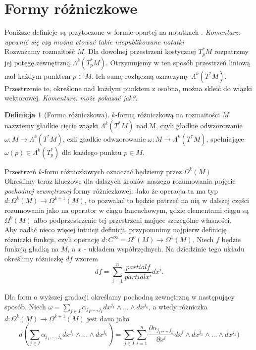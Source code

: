 \documentclass[licencjacka]{pracamgr}
\theoremstyle{definition}
\newtheorem{definition}{Definicja}[section]
\theoremstyle{definition}
\theoremstyle{plain}
\theoremstyle{plain}
\begin{document}
\section{Formy różniczkowe}
Poniższe definicje są przytoczone w formie opartej na notatkach
\cite{duszenko}. 
\emph{Komentarz: upewnić się czy można ctować takie niepublikowane notatki}
\\

Rozważamy rozmaitość $M$. Dla dowolnej przestrzeni kostycznej 
$T_p^\ast M$ rozpatrzmy jej potęgę zewnętrzną $\Lambda^k(T_p^\ast M)$.
Otrzymujemy w ten sposób przestrzeń liniową nad każdym punktem $p \in M$.
Ich sumę rozłączną oznaczymy $\Lambda^k(T^\ast M)$. Przestrzenie te,
określone nad każdym punktem z osobna, można skleić do wiązki wektorowej.
\emph{Komentarz: może pokazać jak?}. \\

\begin{definition}[Forma różniczkowa]
  $k$-formą różniczkową na rozmaitości $M$ nazwiemy gładkie cięcie
  wiązki $\Lambda^k(T^\ast M)$ nad M, czyli gładkie odwzorowanie
  $\omega: M \rightarrow \Lambda^k (T^\ast M)$, czli gładkie
  odwzorowanie $\omega: M \rightarrow \Lambda^k(T^\ast M)$, spełniające
  $\omega(p) \in \Lambda^k(T_p^\ast)$ dla każdego punktu $p \in M$.
\end{definition}

Przestrzeń $k$-form różniczkowych oznaczać będziemy przez $\Omega^k(M)$ \\

Określimy teraz kluczowe dla dalszych kroków naszego rozumowania pojęcie
\emph{pochodnej zewnętrznej} formy różniczkowej. Jako że operacja
ta ma typ $d: \Omega^k(M) \rightarrow \Omega^{k+1} (M)$, to pozwalać
to będzie patrzeć na nią w dalszej części rozumowania jako na operator
w ciągu łancuchowym, gdzie elementami ciągu są $\Omega^k(M)$ albo podprzestrzenie
tej przestrzeni mające szczególne własności. \\

Aby nadać nieco więcej intuicji definicji, przypomnimy najpierw
definicję różniczki funkcji, czyli operację 
$d: C^\infty = \Omega^o(M) \rightarrow \Omega^1(M)$. Niech $f$ będzie funkcją
gładką na $M$, a $x$ -  układem współrzędnych. Na dziedzinie tego układu
określimy różniczkę $df$ wzorem
\[
df = \sum_{i=1}^n \frac{partial f}{partial x^i} dx^i.
\] \\

Dla form o wyższej gradacji określamy pochodną zewnętrzną w następujący
sposób. Niech 
$\omega = \sum_{j \in I} \alpha_{j_1, ..., j_k} dx^{j_1} \wedge ... \wedge dx^{j_k}$,
a wtedy różniczka $d: \Omega^k(M) \rightarrow \Omega^{k+1}(M)$ jest dana jako
\[ %
d( \sum_{j \in I} \alpha_{j_1, ..., j_k} dx^{j_1} \wedge ... \wedge dx^{j_k}) = 
 \sum_{j \in I} \sum_{i=1}^n
 \frac{ \partial \alpha_{j_1, ..., j_k}} {\partial x^i} dx^i
                            \wedge dx^{j_1} \wedge ... \wedge dx^{j_k})
\]
\end{document}
